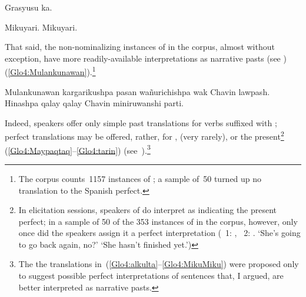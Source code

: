 %
{Grasyusu ka.}%
{}%
{}{}%

%
{Mikuyari. Mikuyari.}%
{}%
{}{}%

\noindent
That said, the non-nominalizing instances of  in the corpus, almost without exception, have more readily-available interpretations as narrative pasts (see ) (\ref{Glo4:Mulankunawan}).\footnote{The corpus counts~1157 instances of ; a sample of~50 turned up no translation to the Spanish perfect.}

%
{Mulankunawan kargarikushpa pasan wañurichishpa wak Chavin lawpash. Hinashpa qalay qalay Chavin miniruwanshi parti.}%
{}%
{}{}%

\noindent
Indeed, speakers offer only simple past translations for verbs suffixed with ; perfect translations may be offered, rather, for ,  (very rarely), or the present\footnote{In elicitation sessions, speakers of \SYQ{} do interpret  as indicating the present perfect; in a sample of 50 of the 353 instances of  in the corpus, however, only once did the speakers assign it a perfect interpretation (\spkr~1:  ,  \spkr~2:  . ‘She’s going to go back again, no?’ ‘She hasn’t finished yet.’)} (\ref{Glo4:Maypaqtaq}--\ref{Glo4:tarin}) (see~).\footnote{The the translations in~(\ref{Glo4:alkulta}--\ref{Glo4:MikuMiku}) were proposed only to suggest possible perfect interpretations of sentences that, I argued, are better interpreted as narrative pasts.}

